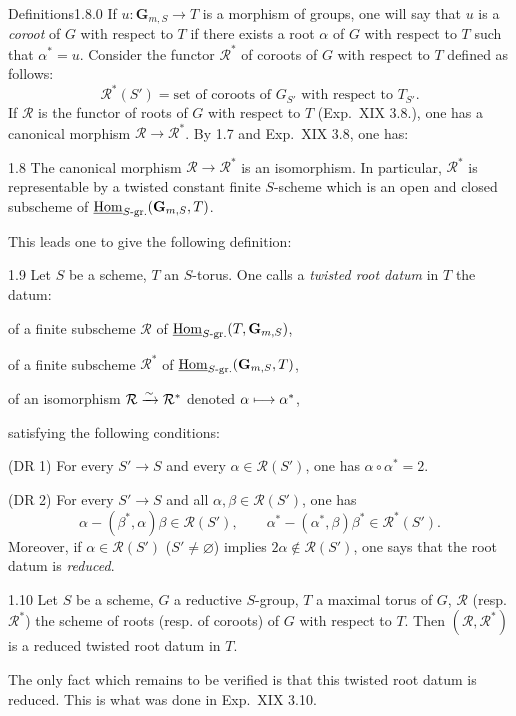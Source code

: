 \begin{enoncerm}{Definitions}{1.8.0}\label{XXII.1.8.0}
{\renewcommand{\thefootnote}{(3)}}%
If $u:\mathbf G_{m,S}\to T$ is a morphism of groups, one will say that $u$ is a \emph{coroot} of $G$ with respect to $T$ if there exists a root $\alpha$ of $G$ with respect to $T$ such that $\alpha^*=u$. Consider the functor $\mathcal R^*$ of coroots of $G$ with respect to $T$ defined as follows:
\[
\mathcal R^*(S')=\text{set of coroots of $G_{S'}$ with respect to $T_{S'}$}.
\]
If $\mathcal R$ is the functor of roots of $G$ with respect to $T$ (Exp.~XIX 3.8.), one has a canonical morphism $\mathcal R\to\mathcal R^*$. By 1.7 and Exp.~XIX 3.8, one has:
\end{enoncerm}
\begin{corollary}{1.8}\label{XXII.1.8}
The canonical morphism $\mathcal R\to\mathcal R^*$ is an isomorphism. In particular, $\mathcal R^*$ is representable by a twisted constant finite $S$-scheme which is an open and closed subscheme of $\underline{\operatorname{Hom}}_{S\text{-gr.}}(\mathbf G_{m,S},T)$.
\end{corollary}
This leads one to give the following definition:
\begin{definition}{1.9}\label{XXII.1.9}
Let $S$ be a scheme, $T$ an $S$-torus. One calls a \emph{twisted root datum} in $T$ the datum:
\begin{enumeratei}
\item of a finite subscheme $\mathcal R$ of $\underline{\operatorname{Hom}}_{S\text{-gr.}}(T,\mathbf G_{m,S})$,
\item of a finite subscheme $\mathcal R^*$ of $\underline{\operatorname{Hom}}_{S\text{-gr.}}(\mathbf G_{m,S},T)$,
\item of an isomorphism $\mathcal R\xrightarrow{\sim}\mathcal R^*$ denoted $\alpha\longmapsto\alpha^*$,
\end{enumeratei}
satisfying the following conditions:

(DR 1) For every $S'\to S$ and every $\alpha\in\mathcal R(S')$, one has $\alpha\circ\alpha^*=2$.

(DR 2) For every $S'\to S$ and all $\alpha,\beta\in\mathcal R(S')$, one has
\[
\alpha-(\beta^*,\alpha)\beta\in\mathcal R(S'),\qquad
\alpha^*-(\alpha^*,\beta)\beta^*\in\mathcal R^*(S').
\]
Moreover, if $\alpha\in\mathcal R(S')$ ($S'\ne\varnothing$) implies $2\alpha\notin\mathcal R(S')$, one says that the root datum is \emph{reduced}.
\end{definition}
\begin{proposition}{1.10}\label{XXII.1.10}
Let $S$ be a scheme, $G$ a reductive $S$-group, $T$ a maximal torus of $G$, $\mathcal R$ (resp. $\mathcal R^*$) the scheme of roots (resp. of coroots) of $G$ with respect to $T$. Then $(\mathcal R,\mathcal R^*)$ is a reduced twisted root datum in $T$.
\end{proposition}
The only fact which remains to be verified is that this twisted root datum is reduced. This is what was done in Exp.~XIX 3.10.


